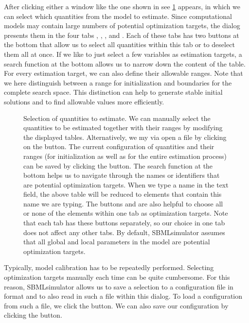 After clicking either a window like the one shown in see \cref{fig:quantitySelection} appears, in which we can select which quantities from the model to estimate.
Since computational models may contain large numbers of potential optimization targets, the dialog presents them in the four tabs , , , and .
Each of these tabs has two buttons at the bottom that allow us to select all quantities within this tab or to deselect them all at once.
If we like to just select a few variables as estimation targets, a search function at the bottom allows us to narrow down the content of the table.
For every estimation target, we can also define their allowable ranges.
Note that we here distinguish between a range for initialization and boundaries for the complete search space.
This distinction can help to generate stable initial solutions and to find allowable values more efficiently.
\begin{figure}[t]
\centering
{}
\caption[Selection of quantities to estimate]{Selection of quantities to estimate.
We can manually select the quantities to be estimated together with their ranges by modifying the displayed tables.
Alternatively, we my via open a \CSV file by clicking on the  button.
The current configuration of quantities and their ranges (for initialization as well as for the entire estimation process) can be saved by clicking the  button.
The search function at the bottom helps us to navigate through the names or identifiers that are potential optimization targets.
When we type a name in the text field, the above table will be reduced to elements that contain this name we are typing.
The buttons  and  are also helpful to choose all or none of the elements within one tab as optimization targets.
Note that each tab has these buttons separately, so our choice in one tab does not affect any other tabs.
By default, SBMLsimulator assumes that all global and local parameters in the model are potential optimization targets.}
\label{fig:quantitySelection}
\end{figure}

Typically, model calibration has to be repeatedly performed.
Selecting optimization targets manually each time can be quite cumbersome.
For this reason, SBMLsimulator allows us to save a selection to a configuration file in \CSV format and to also read in such a file within this dialog.
To load a configuration from such a file, we click the  button.
We can also save our configuration by clicking the  button.


